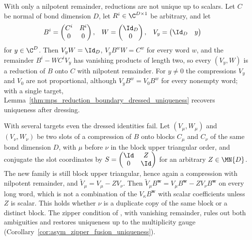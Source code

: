 \begin{remark}%
    \label{rem:mpoalg_nonunique}
    With only a nilpotent remainder, reductions are not unique up to scalars.
    Let $C$ be normal of bond dimension $D$, let $R^i\in\C^{D\times1}$ be
    arbitrary, and let
    \begin{align}
        B^i & =\begin{pmatrix}C^i & R^i\\ 0 & 0\end{pmatrix},
            &
        W   & =\begin{pmatrix}\Id_D\\ 0\end{pmatrix},
            &
        V_y & =\begin{pmatrix}\Id_D & y\end{pmatrix}
        \label{eq:mpoalg_nonunique}
    \end{align}
    for $y\in\C^D$. Then $V_yW=\Id_D$, $V_yB^wW=C^w$ for every word $w$, and
    the remainder $B^i-WC^iV_y$ has vanishing products of length two, so
    every $(V_y,W)$ is a reduction of $B$ onto $C$ with nilpotent remainder.
    For $y\neq0$ the compressions $V_y$ and $V_0$ are not proportional,
    although $V_yB^w=V_0B^w$ for every nonempty word; with a single target,
    Lemma~\ref{thm:mps_reduction_boundary_dressed_uniqueness} recovers
    uniqueness after dressing.

    With several targets even the dressed identities fail. Let
    $(V_\mu,W_\mu)$ and $(V_\nu,W_\nu)$ be two slots of a compression of $B$
    onto blocks $C_\mu$ and $C_\nu$ of the same bond dimension $D$, with
    $\mu$ before $\nu$ in the block upper triangular order, and conjugate the
    slot coordinates by $S=\begin{pmatrix}\Id & Z\\ 0 & \Id\end{pmatrix}$
    for an arbitrary $Z\in\MN{D}$. The new family is still block upper
    triangular, hence again a compression with nilpotent remainder, and
    $\widetilde V_\mu=V_\mu-ZV_\nu$. Then
    $\widetilde V_\mu B^{\mathbf w}=V_\mu B^{\mathbf w}-ZV_\nu B^{\mathbf w}$
    on every long word, which is not a combination of the
    $V_\kappa B^{\mathbf w}$ with scalar coefficients unless $Z$ is scalar.
    This holds whether $\nu$ is a duplicate copy of the same block or a
    distinct block. The zipper condition of \cite{Bultinck2017Anyons}, with
    vanishing remainder, rules out both ambiguities and restores uniqueness up
    to the multiplicity gauge
    (Corollary~\ref{cor:asym_zipper_fusion_uniqueness}).
\end{remark}


